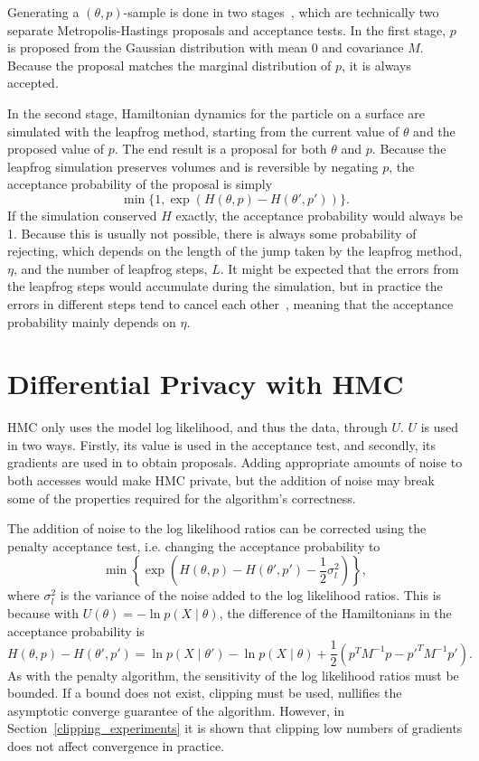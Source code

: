 \documentclass[english,twoside,openright]{HYgraduMLDS}
\begin{document}
Generating a \((\theta, p)\)-sample is done in two stages~\cite{neal2012mcmc}, 
which are technically 
two separate Metropolis-Hastings proposals and acceptance tests. In the first 
stage, \(p\) is proposed from the Gaussian distribution with mean 0 and 
covariance \(M\). Because the proposal matches the marginal distribution of 
\(p\), it is always accepted.

In the second stage, Hamiltonian dynamics for the particle on a surface are 
simulated with the leapfrog method, starting from the current value 
of \(\theta\) and the proposed value of \(p\). The end result is a proposal 
for both \(\theta\) and \(p\). Because the leapfrog simulation preserves volumes 
and is reversible by negating \(p\), the acceptance probability of the 
proposal is simply
\[
    \min\{1, \exp(H(\theta, p) - H(\theta', p'))\}.
\]
If the simulation conserved \(H\) exactly, the acceptance probability would 
always be 1. Because this is usually not possible, there is always some probability 
of rejecting, which depends on the length of the jump taken by the leapfrog 
method, \(\eta\), and the number of leapfrog steps, \(L\). It might be expected 
that the errors from the leapfrog steps would accumulate during the simulation, 
but in practice the errors in different steps tend to cancel each 
other~\cite{neal2012mcmc}, meaning 
that the acceptance probability mainly depends on \(\eta\).

\section{Differential Privacy with HMC}\label{dp_hmc_section}

HMC only uses the model log likelihood, and thus the data, through \(U\).
\(U\) is used in two ways. Firstly, its value is used in the acceptance test,
and secondly, its gradients are used in to obtain proposals. Adding appropriate
amounts of noise to both accesses would make HMC private, but the addition of
noise may break some of the properties required for the algorithm's correctness.

The addition of noise to the log likelihood ratios can be corrected using the penalty
acceptance test, i.e. changing the acceptance probability to
\[
    \min\left\{\exp\left(H(\theta, p) - H(\theta', p') - \frac{1}{2}\sigma_{l}^{2}\right)\right\},
\]
where \(\sigma_{l}^{2}\) is the variance of the noise added to the log likelihood
ratios. This is because with \(U(\theta) = -\ln p(X\mid \theta)\), the difference
of the Hamiltonians in the acceptance probability is
\[
  H(\theta, p) - H(\theta', p') = \ln p(X\mid \theta') - \ln p(X\mid \theta)
  + \frac{1}{2}(p^{T}M^{-1}p - p'^{T}M^{-1}p').
\]
As with the penalty algorithm, the sensitivity of the log likelihood ratios must
be bounded. If a bound does not exist, clipping must be used, nullifies the asymptotic
converge guarantee of the algorithm. However, in Section~\ref{clipping_experiments}
it is shown that
clipping low numbers of gradients does not affect convergence in practice.
\end{document}
